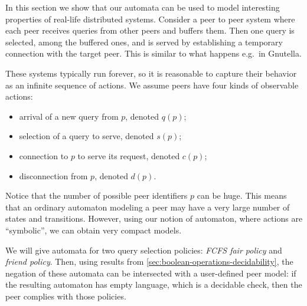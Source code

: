
In this section we show that our automata can be used to model interesting properties of real-life distributed systems. Consider a peer to peer system where each peer receives queries from other peers and buffers them. Then one query is selected, among the buffered ones, and is served by establishing a temporary connection with the target peer. This is similar to what happens e.g.\ in Gnutella.

These systems typically run forever, so it is reasonable to capture their behavior as an infinite sequence of actions. We assume peers have four kinds of observable actions: 
\begin{itemize}
	\item arrival of a new query from $p$, denoted $q(p)$; 
	\item selection of a query to serve, denoted $s(p)$; 
	\item connection to $p$ to serve its request, denoted $c(p)$; 
	\item disconnection from $p$, denoted $d(p)$.
\end{itemize}
%
Notice that the number of possible peer identifiers $p$ can be huge. This means that an ordinary automaton modeling a peer may have a very large number of states and transitions. However, using our notion of automaton, where actions are ``symbolic'', we can obtain very compact models.

We will give automata for two query selection policies: \emph{FCFS fair policy} and \emph{friend policy}. Then, using results from \autoref{sec:boolean-operations-decidability}, the negation of these automata can be intersected with a user-defined peer model: if the resulting automaton has empty language, which is a decidable check, then the peer complies with those policies.




